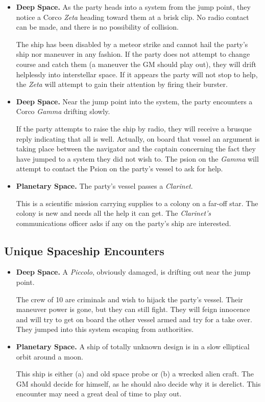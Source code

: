 \begin{itemize}
\item \textbf{Deep Space.} As the party heads into a system from the
  jump point, they notice a Corco \emph{Zeta} heading toward them at a
  brisk clip.  No radio contact can be made, and there is no
  possibility of collision.
  
  The ship has been disabled by a meteor strike and cannot hail the
  party's ship nor maneuver in any fashion.  If the party does not
  attempt to change course and catch them (a maneuver the GM should
  play out), they will drift helplessly into interstellar space.  If
  it appears the party will not stop to help, the \emph{Zeta} will
  attempt to gain their attention by firing their burster.
\item \textbf{Deep Space.} Near the jump point into the system, the
  party encounters a Corco \emph{Gamma} drifting slowly.
  
  If the party attempts to raise the ship by radio, they will receive
  a brusque reply indicating that all is well.  Actually, on board
  that vessel an argument is taking place between the navigator and
  the captain concerning the fact they have jumped to a system they
  did not wish to.  The psion on the \emph{Gamma} will attempt to
  contact the Psion on the party's vessel to ask for help.
\item \textbf{Planetary Space.} The party's vessel passes a
  \emph{Clarinet}.
  
  This is a scientific mission carrying supplies to a colony on a
  far-off star.  The colony is new and needs all the help it can get.
  The \emph{Clarinet's} communications officer asks if any on the
  party's ship are interested.
\end{itemize}


\subsection{Unique Spaceship Encounters}
\label{sec:uniq-spac-enco}

\begin{itemize}
\item \textbf{Deep Space.} A \emph{Piccolo}, obviously damaged, is
  drifting out near the jump point.
  
  The crew of 10 are criminals and wish to hijack the party's vessel.
  Their maneuver power is gone, but they can still fight.  They will
  feign innocence and will try to get on board the other vessel armed
  and try for a take over.  They jumped into this system escaping from
  authorities.
\item \textbf{Planetary Space.} A ship of totally unknown design is in
  a slow elliptical orbit around a moon.
  
  This ship is either (a) and old space probe or (b) a wrecked alien
  craft.  The GM should decide for himself, as he should also decide
  why it is derelict.  This encounter may need a great deal of time to
  play out.
\end{itemize}


